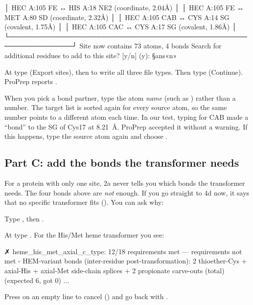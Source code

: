 \begin{steps}
\begin{screen}
│   HEC A:105 FE ↔ HIS A:18 NE2 (coordinate, 2.04Å)             │
│   HEC A:105 FE ↔ MET A:80 SD (coordinate, 2.32Å)              │
│   HEC A:105 CAB ↔ CYS A:14 SG (covalent, 1.75Å)               │
│   HEC A:105 CAC ↔ CYS A:17 SG (covalent, 1.86Å)               │
└───────────────────────────────────────────────────────────────┘
Site now contains 73 atoms, 4 bonds
Search for additional residues to add to this site? [y/n] (y): §ans«n»
\end{screen}
  \item At  type  (Export sites), then
         to write all three file types. Then type 
        (Continue). ProPrep reports
        .
\end{steps}

\begin{watchout}
When you pick a bond partner, type the atom \emph{name} (such as )
rather than a number. The target list is sorted again for every source atom,
so the same number points to a different atom each time. In our test, typing
 for CAB made a ``bond'' to the SG of Cys17 at 8.21~\AA. ProPrep
accepted it without a warning. If this happens, type the source atom again and
choose .
\end{watchout}

\subsection*{Part C: add the bonds the transformer needs}

For a protein with only one site, 2a never tells you which bonds the
transformer needs. The four bonds above are \emph{not} enough. If you go
straight to 4d now, it says that no specific transformer fits
(). You can ask why:

\begin{steps}
  \item Type , then .
  \item At  type . For the
        His/Met heme transformer you see:
\begin{screen}
  ✗ heme_his_met_axial_c_type: 12/18 requirements met — requirements not met
      - HEM-variant bonds (inter-residue post-transformation): 2 thioether-Cys
        + axial-His + axial-Met side-chain splices + 2 propionate carve-outs
        (total) (expected 6, got 0)
...
\end{screen}
  \item Press  on an empty line to cancel
        () and go back with .
\end{steps}

